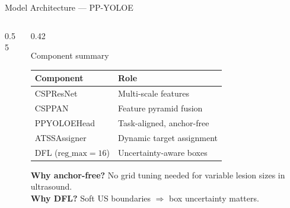\documentclass[aspectratio=169, 10pt]{beamer}
\begin{document}
\begin{frame}{Model Architecture — PP-YOLOE}
\begin{columns}[T]
\begin{column}{0.55\textwidth}
    \end{column}
    \begin{column}{0.42\textwidth}
      \vspace{4pt}
      \begin{block}{Component summary}
        \small
        \begin{tabular}{ll}
          \toprule
          Component & Role \\
          \midrule
          CSPResNet   & Multi-scale features \\
          CSPPAN      & Feature pyramid fusion \\
          PPYOLOEHead & Task-aligned, anchor-free \\
          ATSSAssigner & Dynamic target assignment \\
          DFL ($\text{reg\_max}=16$) & Uncertainty-aware boxes \\
          \bottomrule
        \end{tabular}
      \end{block}
      \vspace{4pt}
      \textbf{Why anchor-free?} No grid tuning needed for variable lesion sizes in ultrasound.\\[4pt]
      \textbf{Why DFL?} Soft US boundaries $\Rightarrow$ box uncertainty matters.
    \end{column}
  \end{columns}
\end{frame}
\end{document}
